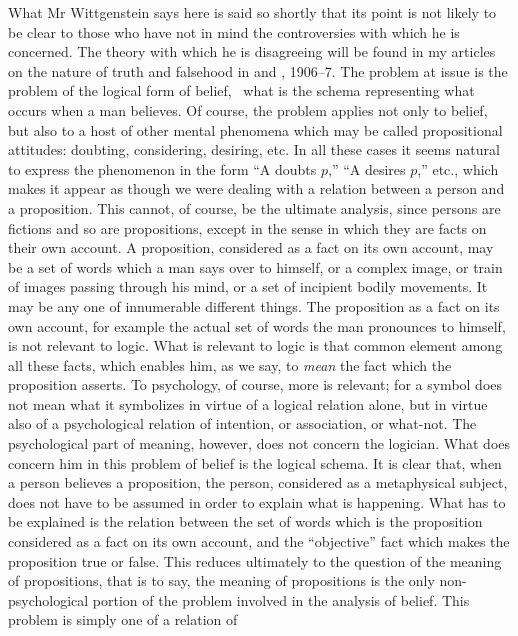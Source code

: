 What Mr Wittgenstein says here is said so shortly
that its point is not likely to be clear to those who have
not in mind the controversies with which he is concerned.
The theory with which he is disagreeing will be found
in my articles on the nature of truth and falsehood in
 and , 1906--7. The problem at issue is the problem of
the logical form of belief, \idEst\ what is the schema representing
what occurs when a man believes. Of course, the
problem applies not only to belief, but also to a host of
other mental phenomena which may be called propositional
attitudes: doubting, considering, desiring, etc. In all
these cases it seems natural to express the phenomenon
in the form ``A doubts $p$,'' ``A desires $p$,'' etc., which
makes it appear as though we were dealing with a relation
between a person and a proposition. This cannot, of
course, be the ultimate analysis, since persons are fictions
and so are propositions, except in the sense in which they
are facts on their own account. A proposition, considered
as a fact on its own account, may be a set of words which
a man says over to himself, or a complex image, or train
of images passing through his mind, or a set of incipient
bodily movements. It may be any one of innumerable
different things. The proposition as a fact on its own
account, for example the actual set of words the man
pronounces to himself, is not relevant to logic. What is
relevant to logic is that common element among all these
facts, which enables him, as we say, to \emph{mean} the fact
which the proposition asserts. To psychology, of course,
more is relevant; for a symbol does not mean what it
symbolizes in virtue of a logical relation alone, but in
virtue also of a psychological relation of intention, or
association, or what-not. The psychological part of meaning,
however, does not concern the logician. What does
concern him in this problem of belief is the logical schema.
It is clear that, when a person believes a proposition, the
person, considered as a metaphysical subject, does not
have to be assumed in order to explain what is happening.
What has to be explained is the relation between the set
of words which is the proposition considered as a fact on
its own account, and the ``objective'' fact which makes
the proposition true or false. This reduces ultimately to
the question of the meaning of propositions, that is to
say, the meaning of propositions is the only non-psychological
portion of the problem involved in the analysis
of belief. This problem is simply one of a relation of
